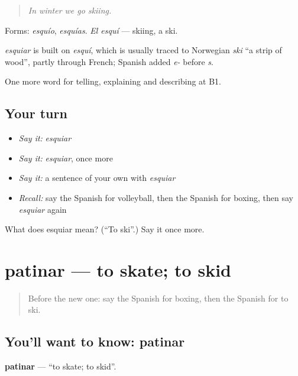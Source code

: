 \begin{quote}
\emph{In winter we go skiing.}
\end{quote}

Forms: \emph{esquío}, \emph{esquías}. \emph{El esquí} — skiing, a ski.

\begin{cousinweb}
\emph{esquiar} is built on \emph{esquí}, which is usually traced to Norwegian \emph{ski} \textquotedblleft{}a strip of wood\textquotedblright{}, partly through French; Spanish added \emph{e-} before \emph{s}.
\end{cousinweb}

\begin{grammarlens}[title={What you've built}]
One more word for telling, explaining and describing at B1.
\end{grammarlens}

\subsection*{Your turn}
\begin{itemize}
\raggedright
  \item \emph{Say it:} \emph{esquiar}
  \item \emph{Say it:} \emph{esquiar}, once more
  \item \emph{Say it:} a sentence of your own with \emph{esquiar}
  \item \emph{Recall:} say the Spanish for volleyball, then the Spanish for boxing, then say \emph{esquiar} again
\end{itemize}

\begin{tcolorbox}[breakable,colback=teal!4,colframe=teal!35!black,title={Before you move on}]
What does esquiar mean? (\textquotedblleft{}To ski\textquotedblright{}.) Say it once more.
\end{tcolorbox}
\section[patinar]{patinar — to skate; to skid}

\label{lesson:ES-C758-patinar}



\begin{quote}
Before the new one: say the Spanish for boxing, then the Spanish for to ski.
\end{quote}

\subsection*{You'll want to know: patinar}
\textbf{patinar} — \textquotedblleft{}to skate; to skid\textquotedblright{}.

